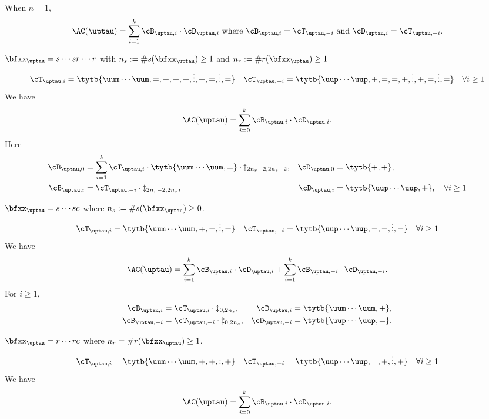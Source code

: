 \documentclass[ssunip]{subfiles}
\begin{document}
{\begin{enumT}
    When $n=1$,
    \[
    \oAC{\uptau} = \sum_{i=1}^{k}\cB_{\uptau,i}\cdot \cD_{\uptau,i} \text{
      where } \cB_{\uptau,i} = \cT_{\uptau,-i} \text{ and } \cD_{\uptau,i} = \cT_{\uptau,-i}.
    \]
    \item $\bfxx_{\uptau} = s\cdots sr\cdots r$ with $n_{s}:=\#s(\bfxx_{\uptau})\geq 1$
    and $n_{r}:=\#r(\bfxx_{\uptau})\geq 1$
    \[
      \cT_{\uptau,i} = \tytb{\uum\cdots\uum,=,+,+,+,\vdots,+,=,\vdots,=}
      \quad \cT_{\uptau,-i} = \tytb{\uup\cdots\uup,+,=,=,+,\vdots,+,=,\vdots,=}
      \quad \forall i\geq 1
    \]
    We have
    \[
      \oAC{\uptau} = \sum_{i=0}^{k}\cB_{\uptau,i}\cdot \cD_{\uptau,i}.
    \]
    Here
      \begin{align*}
        \cB_{\uptau,0} &= \sum_{i=1}^{k} \cT_{\uptau,i}\cdot \tytb{\uum\cdots\uum,=} \cdot\ddagger_{2n_{r}-2,2n_{s}-2}, &
        \cD_{\uptau,0} &= \tytb{+,+},\\
        \cB_{\uptau,i} &= \cT_{\uptau,-i}\cdot \ddagger_{2n_{r}-2,2n_{s}},  &
        \cD_{\uptau,i} &= \tytb{\uup\cdots\uup,+}, \quad \forall i\geq 1\\
      \end{align*}
    \item $\bfxx_{\uptau} = s\cdots sc$ where $n_{s}:=\#s(\bfxx_{\uptau})\geq 0$.
    \begin{equation}\label{eq:ped.ssc}
      \cT_{\uptau,i} = \tytb{\uum\cdots\uum,+,=,\vdots,=} \quad \cT_{\uptau,-i} = \tytb{\uup\cdots\uup,=,=,\vdots,=} \quad \forall i\geq 1
    \end{equation}
    We have
    \[
      \oAC{\uptau} = \sum_{i=1}^{k}\cB_{\uptau,i}\cdot \cD_{\uptau,i}+ \sum_{i=1}^{k}\cB_{\uptau,-i}\cdot \cD_{\uptau,-i}.
    \]
    For $i\geq 1$,
      \begin{align*}
        \cB_{\uptau,i} &= \cT_{\uptau,i}\cdot \ddagger_{0,2n_{s}}, &
        \cD_{\uptau,i} &= \tytb{\uum\cdots\uum,+},\\
        \cB_{\uptau,-i} &= \cT_{\uptau,-i}\cdot \ddagger_{0,2n_{s}},  &
        \cD_{\uptau,-i} &= \tytb{\uup\cdots\uup,=}. %
      \end{align*}
    \item $\bfxx_{\uptau} = r\cdots rc$ where $n_{r} = \#r(\bfxx_{\uptau})\geq 1$.
    \[
      \cT_{\uptau,i} = \tytb{\uum\cdots\uum,+,+,\vdots,+} \quad \cT_{\uptau,-i} = \tytb{\uup\cdots\uup,=,+,\vdots,+}
      \quad \forall i\geq 1
    \]
    We have
    \[
      \oAC{\uptau} = \sum_{i=0}^{k}\cB_{\uptau,i}\cdot \cD_{\uptau,i}.
\]
\end{enumT}}
\end{document}
